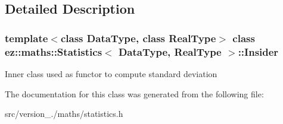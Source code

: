 \subsection{Detailed Description}
\subsubsection*{template$<$class Data\+Type, class Real\+Type$>$\newline
class ez\+::maths\+::\+Statistics$<$ Data\+Type, Real\+Type $>$\+::\+Insider}

Inner class used as functor to compute standard deviation 

The documentation for this class was generated from the following file\+:\begin{DoxyCompactItemize}
\item 
src/version\+\_./maths/statistics.\+h\end{DoxyCompactItemize}
